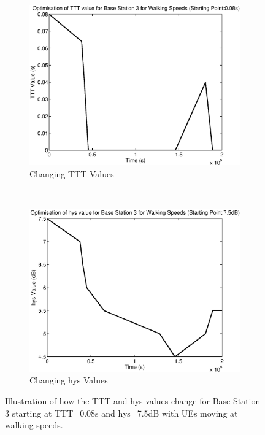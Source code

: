 \begin{figure}[H]
        \centering
        \begin{subfigure}[b]{0.49\textwidth}
                \includegraphics[width=\textwidth]{figures/graphs/walkhighhys/TTT3.eps}
                \caption{Changing TTT Values}
        \end{subfigure}%
        ~ %
        \begin{subfigure}[b]{0.49\textwidth}
                \includegraphics[width=\textwidth]{figures/graphs/walkhighhys/hys3.eps}
                \caption{Changing hys Values}
        \end{subfigure}
        \caption{Illustration of how the TTT and hys values change for Base Station 3 starting at TTT=0.08s and hys=7.5dB with UEs moving at walking speeds.}
\end{figure}
